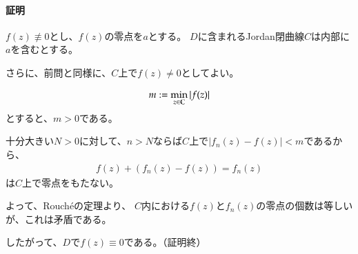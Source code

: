\paragraph{証明}
$f(z)\not\equiv0$とし、$f(z)$の零点を$a$とする。
$D$に含まれるJordan閉曲線$C$は内部に$a$を含むとする。

さらに、前問と同様に、$C$上で$f(z)\neq0$としてよい。

\begin{align*}
    m:=\min_{z\in\mathbb{C}}|f(z)|
\end{align*}
とすると、$m>0$である。

十分大きい$N>0$に対して、$n>N$ならば$C$上で$|f_n(z)-f(z)|<m$であるから、
\begin{align*}
    f(z)+(f_n(z)-f(z))=f_n(z)
\end{align*}
は$C$上で零点をもたない。

よって、Rouch\'{e}の定理より、
$C$内における$f(z)$と$f_n(z)$の零点の個数は等しいが、これは矛盾である。

したがって、$D$で$f(z)\equiv0$である。（証明終）